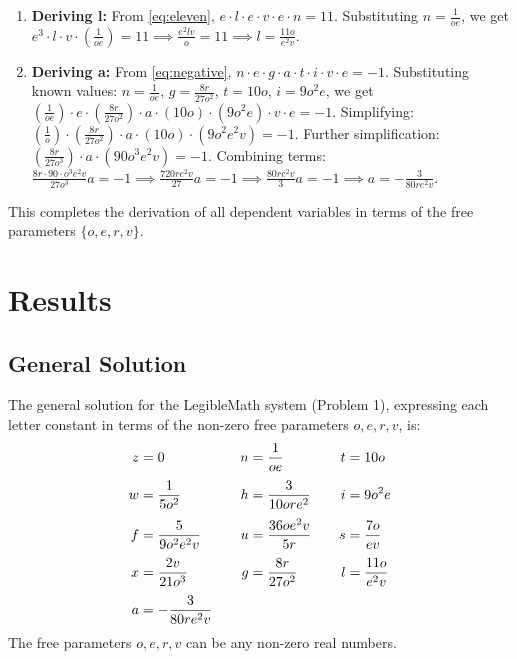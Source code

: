 \documentclass[12pt,a4paper]{article}
\theoremstyle{plain}
\theoremstyle{definition}
\begin{document}
\begin{enumerate}
    \item \textbf{Deriving l:} From \eqref{eq:eleven}, $e \cdot l \cdot e \cdot v \cdot e \cdot n = 11$. Substituting $n = \frac{1}{oe}$, we get $e^3 \cdot l \cdot v \cdot (\frac{1}{oe}) = 11 \implies \frac{e^2lv}{o} = 11 \implies l = \frac{11o}{e^2v}$.
    \item \textbf{Deriving a:} From \eqref{eq:negative}, $n \cdot e \cdot g \cdot a \cdot t \cdot i \cdot v \cdot e = -1$. Substituting known values: $n=\frac{1}{oe}$, $g=\frac{8r}{27o^2}$, $t=10o$, $i=9o^2e$, we get $(\frac{1}{oe}) \cdot e \cdot (\frac{8r}{27o^2}) \cdot a \cdot (10o) \cdot (9o^2e) \cdot v \cdot e = -1$. Simplifying: $(\frac{1}{o}) \cdot (\frac{8r}{27o^2}) \cdot a \cdot (10o) \cdot (9o^2e^2v) = -1$. Further simplification: $(\frac{8r}{27o^3}) \cdot a \cdot (90o^3e^2v) = -1$. Combining terms: $\frac{8r \cdot 90 \cdot o^3 e^2 v}{27 o^3} a = -1 \implies \frac{720 r e^2 v}{27} a = -1 \implies \frac{80 r e^2 v}{3} a = -1 \implies a = -\frac{3}{80re^2v}$.
\end{enumerate}

This completes the derivation of all dependent variables in terms of the free parameters $\{o, e, r, v\}$.

\section{Results}
\label{sec:results}
\subsection{General Solution}
The general solution for the LegibleMath system (Problem 1), expressing each letter constant in terms of the non-zero free parameters $o, e, r, v$, is:
\[
\begin{alignedat}{3}
 z &= 0 & \qquad n &= \dfrac{1}{oe}      & \qquad t &= 10o \\[\jot] %
 w &= \dfrac{1}{5o^2} & \qquad h &= \dfrac{3}{10ore^2} & \qquad i &= 9o^2e \\[\jot]
 f &= \dfrac{5}{9o^2e^2v} & \qquad u &= \dfrac{36oe^2v}{5r} & \qquad s &= \dfrac{7o}{ev} \\[\jot]
 x &= \dfrac{2v}{21o^3} & \qquad g &= \dfrac{8r}{27o^2} & \qquad l &= \dfrac{11o}{e^2v} \\[\jot]
 a &= -\dfrac{3}{80re^2v} & & & & %
\end{alignedat}
\]
The free parameters $o, e, r, v$ can be any non-zero real numbers.
\end{document}

